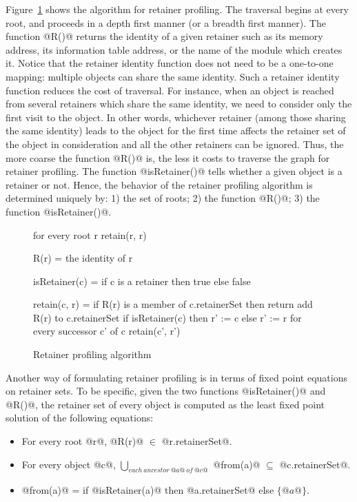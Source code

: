 \documentclass{article}
\begin{document}
Figure~\ref{fig-retaineralgorithm} shows the algorithm for retainer
profiling. The traversal begins at every root, and proceeds 
in a depth first manner (or a breadth first manner).
The function @R()@ returns the identity of a given retainer such
as its memory address, its information table address, or 
the name of the module 
which creates it.
Notice that the retainer identity function does not need to be a 
one-to-one mapping:
multiple objects can share the same identity.
Such a retainer identity function reduces the cost of traversal.
For instance, when an object
is reached from several retainers which share the same identity, we need to
consider only the first visit to the object.
In other words, whichever retainer (among those sharing the same identity) 
leads to the object for the first time affects the retainer set of the object
in consideration
and all the other retainers can be ignored.
Thus, the more coarse the function @R()@ is, the less
it costs to traverse the graph for retainer profiling.
The function @isRetainer()@ tells whether a given object is a retainer or not.
Hence, the behavior of the retainer profiling algorithm is determined 
uniquely by: 1) the set of roots; 2) the function @R()@; 3) the function
@isRetainer()@.

\begin{figure}[ht]
\begin{center}
\begin{code}
for every root r
  retain(r, r)

R(r) =
  the identity of r

isRetainer(c) =
  if c is a retainer then   
    true 
  else 
    false

retain(c, r) =
  if R(r) is a member of c.retainerSet then 
    return
  add R(r) to c.retainerSet
  if isRetainer(c) then 
    r' := c
  else 
    r' := r
  for every successor c' of c
    retain(c', r')
\end{code}
\caption{Retainer profiling algorithm}
\label{fig-retaineralgorithm}
\end{center}
\end{figure}

Another way of formulating retainer profiling is in terms of fixed point
equations on retainer sets.
To be specific, given the two functions @isRetainer()@ and @R()@,
the retainer set of every object is computed as the least fixed point
solution of the following equations:
\begin{itemize}
\item For every root @r@, @R(r)@ $\in$ @r.retainerSet@.
\item For every object @c@, 
$\bigcup_{\mathit{each\ ancestor\ @a@\ of\ @c@}}$ @from(a)@ $\subseteq$ 
@c.retainerSet@.
\item @from(a)@ = if @isRetainer(a)@ then @a.retainerSet@ else $\{@a@\}$.
\end{itemize}
\end{document}

